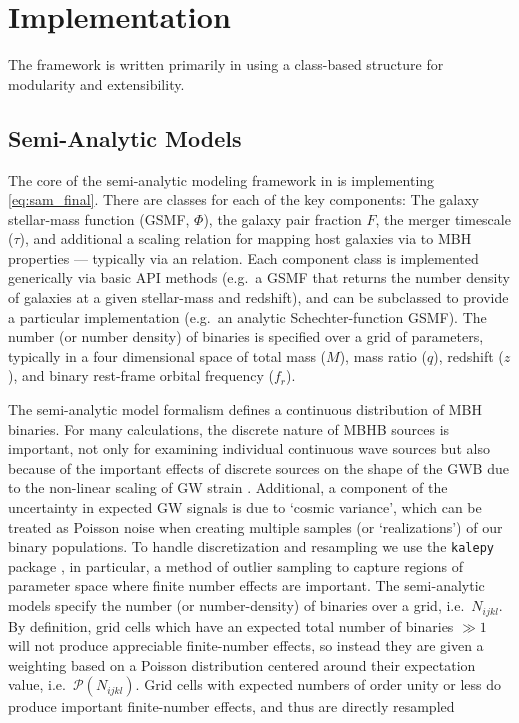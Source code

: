 \section{Implementation}
    \label{sec:imp}

    The \holodeck{} framework is written primarily in \python{} using a class-based structure for modularity and extensibility.

    \subsection{Semi-Analytic Models}
        \label{sec:imp_sam}

        The core of the semi-analytic modeling framework in \holodeck{} is implementing \eqref{eq:sam_final}.  There are classes for each of the key components: The galaxy stellar-mass function (GSMF, $\Phi$), the galaxy pair fraction \(F\), the merger timescale ($\tau$), and additional a scaling relation for mapping host galaxies via to MBH properties --- typically via an \mmbulge{} relation.  Each component class is implemented generically via basic API methods (e.g.~a GSMF that returns the number density of galaxies at a given stellar-mass and redshift), and can be subclassed to provide a particular implementation (e.g.~an analytic Schechter-function GSMF).  The number (or number density) of binaries is specified over a grid of parameters, typically in a four dimensional space of total mass ($M$), mass ratio ($q$), redshift ($z$), and binary rest-frame orbital frequency ($f_r$).

        The semi-analytic model formalism defines a continuous distribution of MBH binaries.  For many calculations, the discrete nature of MBHB sources is important, not only for examining individual continuous wave sources but also because of the important effects of discrete sources on the shape of the GWB due to the non-linear scaling of GW strain \citep{Sesana+2008}.  Additional, a component of the uncertainty in expected GW signals is due to `cosmic variance', which can be treated as Poisson noise when creating multiple samples (or `realizations') of our binary populations.  To handle discretization and resampling we use the \texttt{kalepy} package \citep{kalepy2021}, in particular, a method of outlier sampling to capture regions of parameter space where finite number effects are important.  The \holodeck{} semi-analytic models specify the number (or number-density) of binaries over a grid, i.e.~$N_{ijkl}$.  By definition, grid cells which have an expected total number of binaries $\gg 1$ will not produce appreciable finite-number effects, so instead they are given a weighting based on a Poisson distribution centered around their expectation value, i.e.~$\mathcal{P}(N_{ijkl})$.  Grid cells with expected numbers of order unity or less do produce important finite-number effects, and thus are directly resampled

